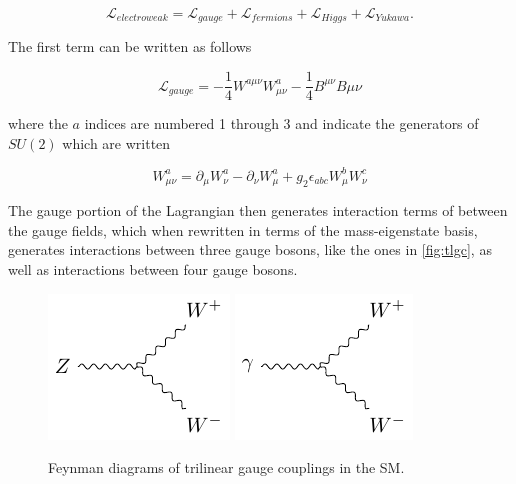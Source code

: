 \begin{equation}
\mathcal{L}_{electroweak} = \mathcal{L}_{gauge} + \mathcal{L}_{fermions} + \mathcal{L}_{Higgs} + \mathcal{L}_{Yukawa} .
\end{equation}

The first term can be written as follows

\begin{equation}
\mathcal{L}_{gauge} = -\frac{1}{4}W^{a\mu\nu}W^a_{\mu\nu} - \frac{1}{4}B^{\mu\nu}B{\mu\nu} 
\end{equation}

where the $a$ indices are numbered 1 through 3 and indicate the generators of $SU(2)$ which are written 

\begin{equation}
W^a_{\mu\nu} = \partial_\mu W^a_\nu - \partial_\nu W^a_\mu + g_2 \epsilon_{abc} W^b_\mu W^c_\nu
\end{equation}

The gauge portion of the Lagrangian then generates interaction terms of between the gauge fields, which when rewritten in terms of the mass-eigenstate basis, generates interactions between three gauge bosons, like the ones in \autoref{fig:tlgc}, as well as interactions between four gauge bosons.

\begin{centering}
\begin{figure}[!hbt]
\myfloatalign
\includegraphics[width=.45\linewidth]{feynman/tlgc_z.pdf}
\includegraphics[width=.45\linewidth]{feynman/tlgc_g.pdf}
\caption{Feynman diagrams of trilinear gauge couplings in the \ac{SM}.}
\label{fig:tlgc}
\end{figure}
\end{centering}

